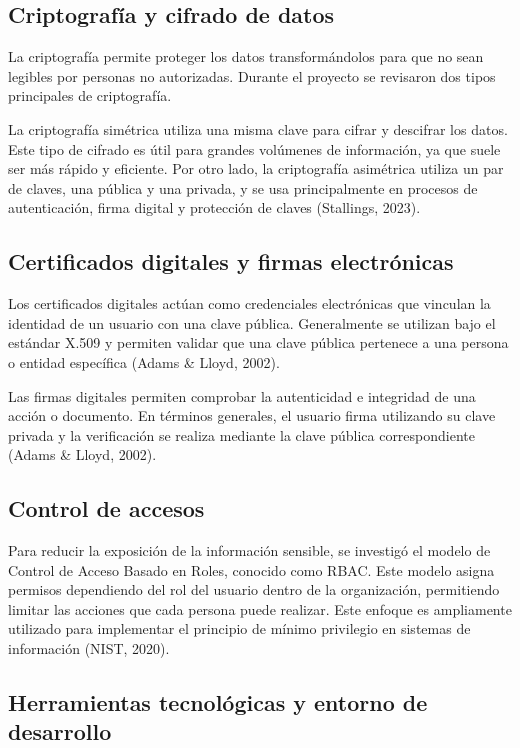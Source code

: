 \documentclass[10pt, letterpaper]{article}
\begin{document}
\subsection{Criptografía y cifrado de datos}

La criptografía permite proteger los datos transformándolos para que no sean legibles por personas no autorizadas. Durante el proyecto se revisaron dos tipos principales de criptografía.

La criptografía simétrica utiliza una misma clave para cifrar y descifrar los datos. Este tipo de cifrado es útil para grandes volúmenes de información, ya que suele ser más rápido y eficiente. Por otro lado, la criptografía asimétrica utiliza un par de claves, una pública y una privada, y se usa principalmente en procesos de autenticación, firma digital y protección de claves (Stallings, 2023).

\subsection{Certificados digitales y firmas electrónicas}

Los certificados digitales actúan como credenciales electrónicas que vinculan la identidad de un usuario con una clave pública. Generalmente se utilizan bajo el estándar X.509 y permiten validar que una clave pública pertenece a una persona o entidad específica (Adams \& Lloyd, 2002).

Las firmas digitales permiten comprobar la autenticidad e integridad de una acción o documento. En términos generales, el usuario firma utilizando su clave privada y la verificación se realiza mediante la clave pública correspondiente (Adams \& Lloyd, 2002).

\subsection{Control de accesos}

Para reducir la exposición de la información sensible, se investigó el modelo de Control de Acceso Basado en Roles, conocido como RBAC. Este modelo asigna permisos dependiendo del rol del usuario dentro de la organización, permitiendo limitar las acciones que cada persona puede realizar. Este enfoque es ampliamente utilizado para implementar el principio de mínimo privilegio en sistemas de información (NIST, 2020).

\subsection{Herramientas tecnológicas y entorno de desarrollo}
\end{document}
